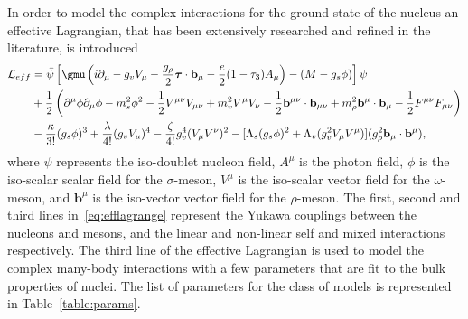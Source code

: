 In order to model the complex interactions for the ground state of the nucleus an effective Lagrangian, that has been extensively researched and refined in the literature, is introduced~\cite{todd:2003:relativistic, muller:1996:relativistic, utama:2016:nuclear} 
\begin{equation}\label{eq:efflagrange}
\begin{aligned}
\mathcal{L}_{eff} &= \bar{\psi} \left[ \gmu\left( i\partial _{\mu} - g_v V_{\mu} - \frac{g_{\rho}}{2} \boldsymbol{\tau}\cdot \mathbf{b}_{\mu} - \frac{e}{2}(1-\tau _3)A_{\mu}\right) -(M-g_s\phi )\right]\psi 
\\
&+ \frac{1}{2} \left( \partial ^{\mu}\phi\partial _{\mu}\phi - m_s^2\phi ^2 - \frac{1}{2}V^{\mu\nu}V_{\mu\nu} +m_v^2 V^{\mu}V_{\nu} - \frac{1}{2} \mathbf{b}^{\mu\nu}\cdot\mathbf{b}_{\mu\nu} + m_{\rho}^2\mathbf{b}^{\mu}\cdot\mathbf{b}_{\mu}-\frac{1}{2}F^{\mu\nu}F_{\mu\nu}\right) 
\\
&- \frac{\kappa}{3!}(g_s\phi)^3+\frac{\lambda}{4!}(g_v V_{\mu})^4-\frac{\zeta}{4!}g_v^4(V_{\mu}V^{\nu})^2-[\Lambda _s (g_s\phi)^2 + \Lambda _v (g_v^2V_{\mu}V^{\mu})](g_{\rho}^2\mathbf{b}_{\mu}\cdot\mathbf{b}^{\mu}),
\end{aligned}
\end{equation}
where $\psi$ represents the iso-doublet nucleon field, $A^{\mu}$ is the photon field, $\phi$ is the iso-scalar scalar field for the $\sigma$-meson, $V^{\mu}$ is the iso-scalar vector field for the $\omega$-meson, and $\mathbf{b}^{\mu}$ is the iso-vector vector field for the $\rho$-meson. The first, second and third lines in~\eqref{eq:efflagrange} represent the Yukawa couplings between the nucleons and mesons, and the linear and non-linear self and mixed interactions respectively. The third line of the effective Lagrangian is used to model the complex many-body interactions with a few parameters that are fit to the bulk properties of nuclei. The list of parameters for the class of models is represented in Table~\ref{table:params}. 

